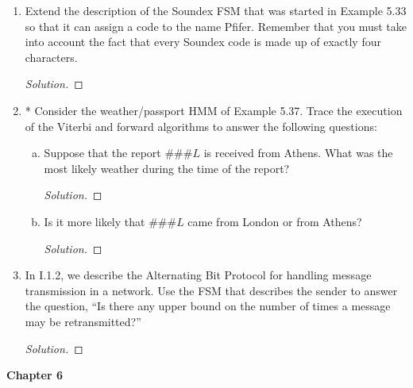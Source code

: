 \documentclass[10pt]{article}
\newcommand{\images}{/home/gparker/classes/341/images}
\begin{document}
\begin{enumerate}[1)]
\begin{center}
\texttt{[image: \\images /hw4barcode.png]}
\end{center}

\begin{proof}[Solution]
\end{proof}


\item
Extend the description of the Soundex FSM that was started in Example 5.33 so that it can assign a code to the name Pfifer.  Remember that you must take into account the fact that every Soundex code is made up of exactly four characters.

\begin{proof}[Solution]
\end{proof}


\item
* Consider the weather/passport HMM of Example 5.37.  Trace the execution of the Viterbi and forward algorithms to answer the following questions:

\begin{enumerate}[a)]
\item
Suppose that the report $\#\#\#L$ is received from Athens.  What was the most likely weather during the time of the report?

\begin{proof}[Solution]
\end{proof}
 
\item
Is it more likely that $\#\#\#L$ came from London or from Athens?
\begin{proof}[Solution]
\end{proof}
\end{enumerate}

\addtocounter{enumi}{2}

\item
In I.1.2, we describe the Alternating Bit Protocol for handling message transmission in a network.  Use the FSM that describes the sender to answer the question, ``Is there any upper bound on the number of times a message may be retransmitted?''
\begin{proof}[Solution]
\end{proof}

\end{enumerate}

\textbf{Chapter 6}
\end{document}

